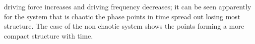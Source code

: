 \documentclass[11pt]{article} %
\begin{document}
driving force increases and driving frequency decreases; it can be seen apparently for the system that is chaotic the phase points in time spread out losing most structure. The case of the non chaotic system shows the points forming a more compact structure with time.
\end{document}
